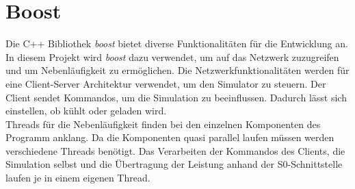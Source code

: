 \section{Boost}
Die C++ Bibliothek \textit{boost} bietet diverse Funktionalitäten für die Entwicklung an. In diesem Projekt wird \textit{boost} dazu verwendet, um auf das Netzwerk zuzugreifen und um Nebenläufigkeit zu ermöglichen. Die Netzwerkfunktionalitäten werden für eine Client-Server Architektur verwendet, um den Simulator zu steuern. Der Client sendet Kommandos, um die Simulation zu beeinflussen. Dadurch lässt sich einstellen, ob kühlt oder geladen wird.\\
Threads für die Nebenläufigkeit finden bei den einzelnen Komponenten des Programm anklang. Da die Komponenten quasi parallel laufen müssen werden verschiedene Threads benötigt. Das Verarbeiten der Kommandos des Clients, die Simulation selbst und die Übertragung der Leistung anhand der S0-Schnittstelle laufen je in einem eigenen Thread.

